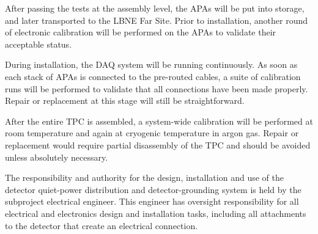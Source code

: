 After passing the tests at the assembly level, the APAs will be 
put into storage, and later transported to the LBNE Far Site.  
Prior to installation, another round of electronic calibration will be 
performed on the APAs to validate their acceptable status.  

During installation, the DAQ system will be running continuously.  As soon 
as each stack of APAs is connected to the pre-routed cables, 
a suite of calibration runs will be performed to validate that all connections have
been made properly.  Repair or replacement at this stage will 
still be straightforward.

After the entire TPC is assembled, a system-wide calibration 
will be performed at room temperature and again at cryogenic 
temperature in argon gas.  Repair or replacement would
require partial disassembly of the TPC and should be avoided 
unless absolutely necessary.  

The responsibility and authority for the design, installation 
and use of the detector quiet-power distribution and 
detector-grounding system is held by the  
subproject electrical engineer. 
This engineer 
has oversight responsibility for all electrical and electronics 
design and installation tasks, including all attachments to the detector 
that create an electrical connection. 



